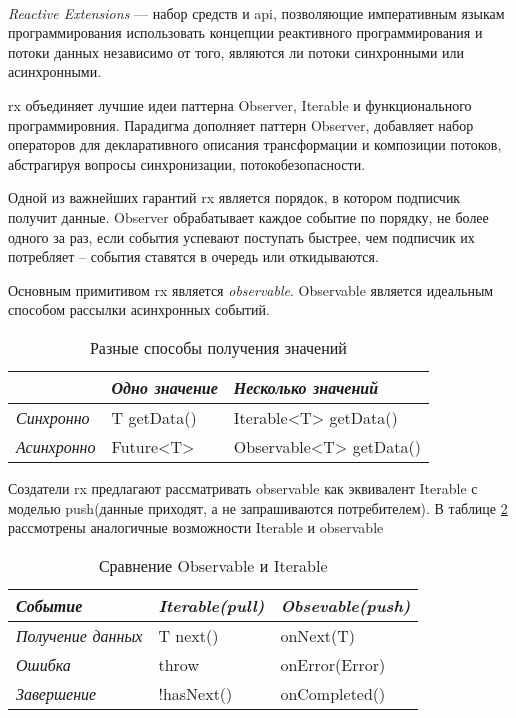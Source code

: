 \paragraph{}
\emph{Reactive Extensions} --- набор средств и \gls{api}, позволяющие императивным языкам программирования использовать концепции реактивного программирования и потоки данных независимо от того, являются ли потоки синхронными или асинхронными. \cite{wiki:rx}

\gls{rx} объединяет лучшие идеи паттерна Observer, Iterable и функционального программировния. Парадигма дополняет паттерн Observer, добавляет набор операторов для декларативного описания трансформации и композиции потоков, абстрагируя вопросы синхронизации, потокобезопасности.

Одной из важнейших гарантий \gls{rx} является порядок, в котором подписчик получит данные. Observer обрабатывает каждое событие по порядку, не более одного за раз, если события успевают поступать быстрее, чем подписчик их потребляет -- события ставятся в очередь или откидываются.

Основным примитивом \gls{rx} является \emph{\gls{observable}}. Observable является идеальным способом рассылки асинхронных событий.

\begin{table}[h!]
\caption{Разные способы получения значений}
\label{theory:archeticture:rx:call}
\centering
\begin{tabularx}{\textwidth}{ |X|X|X| } 
 \hline
  & \emph{Одно значение} & \emph{Несколько значений} \\ 
 \hline
 \emph{Синхронно} & T getData() & Iterable<T> getData() \\ 
 \hline
 \emph{Асинхронно} & Future<T> & Observable<T> getData() \\ 
 \hline
\end{tabularx}
\end{table}

Создатели \gls{rx} предлагают\cite{reactivex:introduction} рассматривать \gls{observable} как эквивалент Iterable с моделью push(данные приходят, а не запрашиваются потребителем). В таблице \ref{theory:archeticture:rx:iterable-observable} рассмотрены аналогичные возможности Iterable и \gls{observable}

\begin{table}[h!]
\caption{Сравнение Observable и Iterable}
\label{theory:archeticture:rx:iterable-observable}
\centering
\begin{tabularx}{\textwidth}{ |X|X|X| } 
 \hline
 \emph{Событие} & \emph{Iterable(pull)} & \emph{Obsevable(push)} \\ 
 \hline
 \emph{Получение данных} & T next() & onNext(T) \\ 
 \hline
 \emph{Ошибка} & throw & onError(Error) \\ 
 \hline
  \emph{Завершение} & !hasNext() & onCompleted() \\ 
 \hline
\end{tabularx}
\end{table}

